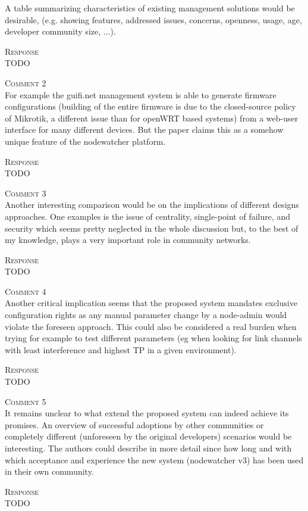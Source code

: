 \documentclass[12pt,twoside,a4paper]{report}
\begin{document}
A table summarizing characteristics of existing management solutions would be desirable, (e.g. showing features, addressed issues, concerns, openness, usage, age, developer community size, ...).

\vspace{0.5cm}\noindent\textsc{Response}\\
TODO

\vspace{0.5cm}\noindent\textsc{Comment 2}\\
For example the guifi.net management system is able to generate firmware configurations (building of the entire firmware is due to the closed-source policy of Mikrotik, a different issue than for openWRT based systems) from a web-user interface for many different devices. But the paper claims this as a somehow unique feature of the nodewatcher platform. 

\vspace{0.5cm}\noindent\textsc{Response}\\
TODO

\vspace{0.5cm}\noindent\textsc{Comment 3}\\
Another interesting comparison would be on the implications of different designs approaches. One examples is the issue of centrality, single-point of failure, and security which seems pretty neglected in the whole discussion but, to the best of my knowledge, plays a very important role in community networks.

\vspace{0.5cm}\noindent\textsc{Response}\\
TODO

\vspace{0.5cm}\noindent\textsc{Comment 4}\\
Another critical implication seems that the proposed system mandates exclusive configuration rights as any manual parameter change by a node-admin would violate the foreseen approach. This could also be considered a real burden when trying for example to test different parameters (eg when looking for link channels with least interference and highest TP in a given environment).

\vspace{0.5cm}\noindent\textsc{Response}\\
TODO

\vspace{0.5cm}\noindent\textsc{Comment 5}\\
It remains unclear to what extend the proposed system can indeed achieve its promises. An overview of successful adoptions by other communities or completely different (unforeseen by the original developers) scenarios would be interesting. The authors could describe in more detail since how long and with which acceptance and experience the new system (nodewatcher v3) has been used in their own community.

\vspace{0.5cm}\noindent\textsc{Response}\\
TODO
\end{document}
